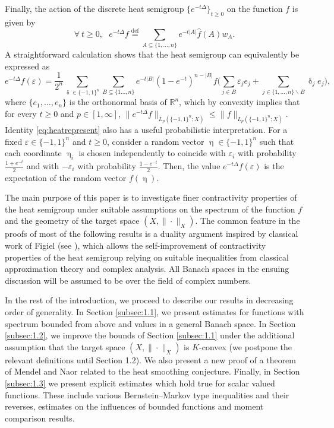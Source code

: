 \documentclass[11pt,reqno]{amsart}
\renewcommand{\leq}{\leqslant}
\renewcommand{\geq}{\geqslant}
\renewcommand{\setminus}{\smallsetminus}
\newcommand{\e}{\varepsilon}
\newcommand{\R}{\mathbb R}
\newcommand{\1}{\mathbf 1}
\theoremstyle{remark}
\newcommand{\eqdef}{\stackrel{\mathrm{def}}{=}}
\renewcommand{\delta}{\updelta}
\renewcommand{\eta}{\upeta}
\begin{document}
Finally, the action of the discrete heat semigroup $\{e^{-t\Delta}\}_{t\geq0}$ on the function $f$ is given by
\begin{equation}
\forall \ t\geq0, \ \ \ e^{-t\Delta} f \eqdef \sum_{A\subseteq\{1,\ldots,n\}} e^{-t|A|}\widehat{f}(A) w_A.
\end{equation}
A straightforward calculation shows that the heat semigroup can equivalently be expressed as
\begin{equation} \label{eq:heatrepresent}
e^{-t\Delta}f(\e) =\frac{1}{2^n} \sum_{\delta\in\{-1,1\}^n} \sum_{B\subseteq\{1\ldots,n\}} e^{-t|B|}(1-e^{-t})^{n-|B|} f\Big(\sum_{j\in B} \e_j e_j + \sum_{j\in \{1,\ldots,n\}\setminus B} \delta_j e_j\Big),
\end{equation}
where $\{e_1,\ldots,e_n\}$ is the orthonormal basis of $\R^n$, which by convexity implies that for every $t\geq0$ and $p\in[1,\infty]$, $\|e^{-t\Delta}f\|_{L_p(\{-1,1\}^n;X)} \leq \|f\|_{L_p(\{-1,1\}^n;X)}$. Identity \eqref{eq:heatrepresent} also has a useful probabilistic interpretation. For a fixed $\e\in\{-1,1\}^n$ and $t\geq0$, consider a random vector $\eta\in\{-1,1\}^n$ such that each coordinate $\eta_i$ is chosen independently to coincide with $\e_i$ with probability $\frac{1+e^{-t}}{2}$ and with $-\e_i$ with probability $\frac{1-e^{-t}}{2}$. Then, the value $e^{-t\Delta}f(\e)$ is the expectation of the random vector $f(\eta)$.

The main purpose of this paper is to investigate finer contractivity properties of the heat semigroup under suitable assumptions on the spectrum of the function $f$ and the geometry of the target space $(X,\|\cdot\|_X)$. The common feature in the proofs of most of the following results is a duality argument inspired by classical work of Figiel (see \cite[Theorem~14.6]{MS86}), which allows the self-improvement of contractivity properties of the heat semigroup relying on suitable inequalities from classical approximation theory and complex analysis. All Banach spaces in the ensuing discussion will be assumed to be over the field of complex numbers.

In the rest of the introduction, we proceed to describe our results in decreasing order of generality. In Section \ref{subsec:1.1}, we present estimates for functions with spectrum bounded from above and values in a general Banach space. In Section \ref{subsec:1.2}, we improve the bounds of Section \ref{subsec:1.1} under the additional assumption that the target space $(X,\|\cdot\|_X)$ is $K$-convex (we postpone the relevant definitions until Section 1.2). We also present a new proof of a theorem of Mendel and Naor \cite{MN14} related to the heat smoothing conjecture. Finally, in Section \ref{subsec:1.3} we present explicit estimates which hold true for scalar valued functions. These include various Bernstein--Markov type inequalities and their reverses, estimates on the influences of bounded functions and moment comparison results.
\end{document}

